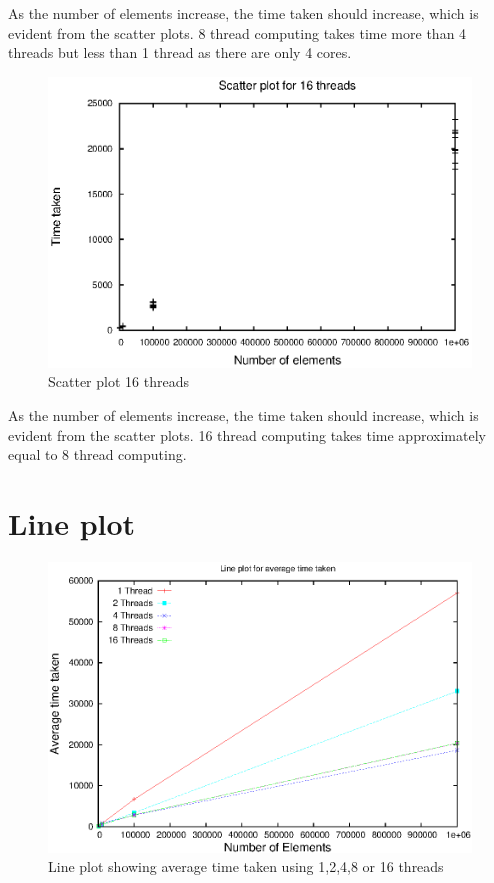 \documentclass[a4paper, 12pt]{report}
\begin{document}
\vskip 0.5in
{\Large As the number of elements increase, the time taken should increase, which is evident from the scatter plots. 8 thread computing takes time more than 4 threads but less than 1 thread as there are only 4 cores.}

\begin{figure}[H]
\centering
\includegraphics[width=1\textwidth]{scatter_16.eps}
 \caption{Scatter plot 16 threads}
\end{figure}

\vskip 0.5in
{\Large As the number of elements increase, the time taken should increase, which is evident from the scatter plots. 16 thread computing takes time approximately equal to 8 thread computing.}

\chapter{Line plot}

\begin{figure}[H]
\centering
\includegraphics[width=1\textwidth]{thread_compare.eps}
 \caption{Line plot showing average time taken using 1,2,4,8 or 16 threads}
\end{figure}
\end{document}
